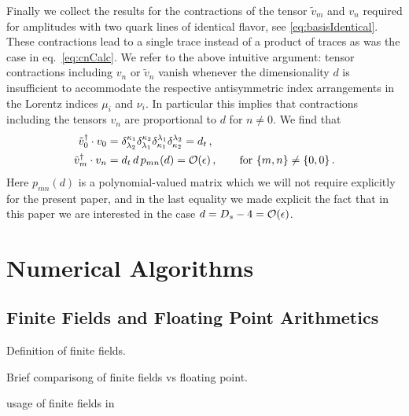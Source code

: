 Finally we collect the results for the contractions of the 
tensor $\tilde v_m$ and $v_n$ required for amplitudes with two
quark lines of identical flavor,
see \cref{eq:basisIdentical}.
These contractions lead to a single trace instead of a product 
of traces as was the case in eq.~\eqref{eq:cnCalc}.
We refer to the above intuitive argument: tensor 
contractions including $v_n$ or $\tilde v_n$ vanish 
whenever the dimensionality $d$ is insufficient to accommodate
the respective antisymmetric index arrangements in the Lorentz 
indices $\mu_i$ and $\nu_i$.
In particular this implies that contractions including the
tensors $v_{n}$ are proportional to $d$ for $n\neq0$. We find
that 
\begin{align}
  \begin{split}
    \tilde v_0^\dagger \cdot v_0 &=
    \delta^{\kappa_1}_{\lambda_2} \delta^{\kappa_2}_{\lambda_1}
    \delta_{\kappa_1}^{\lambda_1} \delta_{\kappa_2}^{\lambda_2} 
    = d_t \,, \\
    \tilde v_m^\dagger \cdot v_{n} &=d_t\,d\,p_{mn}(d) = 
    {\cal O}(\epsilon)\,,\qquad\textrm{for }\{m,n\}\neq\{0,0\}\,.
  \end{split}
\end{align}
Here $p_{mn}(d)$ is a polynomial-valued matrix which we 
will not require explicitly for the present paper, and in the
last equality we made explicit the fact that in this paper we 
are interested in the case $d=D_s-4={\cal O}(\epsilon)$.



\chapter{Numerical Algorithms}

\section{Finite Fields and Floating Point Arithmetics}

Definition of finite fields.

Brief comparisong of finite fields vs floating point.

usage of finite fields in \cite{Klappert:2019emp,Peraro:2016wsq,Peraro:2019svx}


